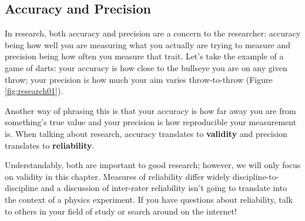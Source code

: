\subsection{Accuracy and Precision}

In research, both accuracy and precision are a concern to the researcher: accuracy being how well you are measuring what you actually are trying to measure and precision being how often you measure that trait. Let's take the example of a game of darts: your accuracy is how close to the bullseye you are on any given throw; your precision is how much your aim varies throw-to-throw (Figure \ref{fig:research01}).

Another way of phrasing this is that your accuracy is how far away you are from something's true value and your precision is how reproducible your measurement is. When talking about research, accuracy translates to \textbf{validity} and precision translates to \textbf{reliability}.

Understandably, both are important to good research; however, we will only focus on validity in this chapter. Measures of reliability differ widely discipline-to-discipline and a discussion of inter-rater reliability isn't going to translate into the context of a physics experiment. If you have questions about reliability, talk to others in your field of study or search around on the internet!

